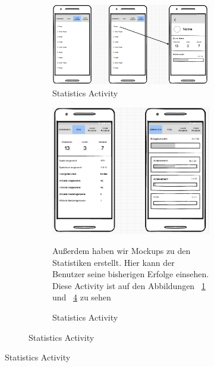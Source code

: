 \documentclass{scrartcl}
\begin{document}
\begin{figure}[!ht]
\begin{figure}[!ht]
\begin{figure}[!ht]
\begin{center}
	\includegraphics[scale=0.58]{img/mockup_stats_1.png}
	\caption{Statistics Activity}
	\label{stats1}
\end{center}
\end{figure}

\begin{figure}[!ht]
\begin{center}
\centering
	\includegraphics[scale=0.75]{img/mockup_stats_2.png}
	\caption{Statistics Activity}
	\label{stats2}
\end{center}
Außerdem haben wir Mockups zu den Statistiken erstellt. Hier kann der Benutzer seine bisherigen Erfolge einsehen. Diese Activity ist auf den Abbildungen ~\ref{stats1} und ~\ref{stats2} zu sehen
\end{figure}

\clearpage


\end{figure}
\end{figure}
\end{document}
